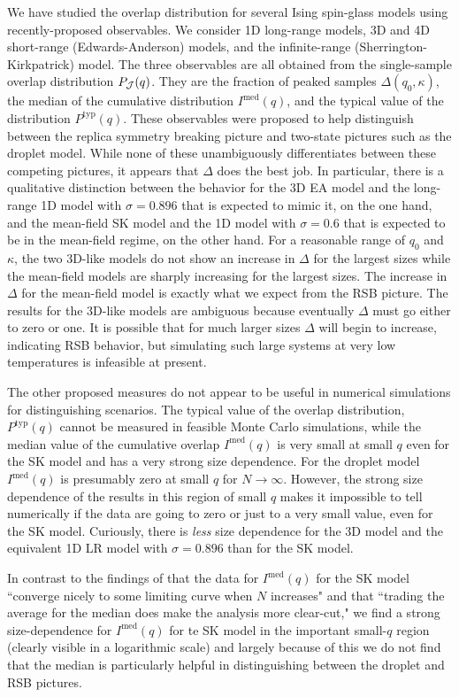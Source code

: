 We have studied the overlap distribution for several Ising spin-glass models
using recently-proposed observables. We consider 1D long-range models, 3D and
4D short-range (Edwards-Anderson) models, and the infinite-range
(Sherrington-Kirkpatrick) model. The three observables are all obtained from
the single-sample overlap distribution $P_{\mathcal{J}}(q)$. They are the fraction of
peaked samples $\Delta(q_0,\kappa)$, the median of the cumulative distribution
$I^{\mathrm{med}}(q)$, and the typical value of the distribution
$P^{\mathrm{typ}}(q)$. These observables were proposed to help distinguish
between the replica symmetry breaking picture and two-state pictures such as
the droplet model. While none of these unambiguously differentiates between
these competing pictures, it appears that $\Delta$ does the best job. In
particular, there is a qualitative distinction between the behavior for the 3D
EA model and the long-range 1D model with $\sigma=0.896$ that is expected to
mimic it, on the one hand, and the mean-field SK model and the 1D model with
$\sigma=0.6$ that is expected to be in the mean-field regime, on the other
hand. For a reasonable range of $q_0$ and $\kappa$, the two 3D-like models do
not show an increase in $\Delta$ for the largest sizes while the mean-field
models are sharply increasing for the largest sizes. The increase in $\Delta$
for the mean-field model is exactly what we expect from the RSB picture. The
results for the 3D-like models are ambiguous because eventually $\Delta$ must
go either to zero or one. It is possible that for much larger sizes $\Delta$
will begin to increase, indicating RSB behavior, but simulating such large
systems at very low temperatures is infeasible at present.

The other proposed measures do not appear to be useful in numerical simulations
for distinguishing scenarios. The typical value of the overlap distribution,
$P^{\mathrm{typ}}(q)$ cannot be measured in feasible Monte Carlo simulations,
while the median value of the cumulative overlap $I^{\mathrm{med}}(q)$ is very
small at small $q$ even for the SK model and has a very strong size dependence.
For the droplet model $I^{\mathrm{med}}(q)$ is presumably zero at small $q$ for
$N \to \infty$. However, the strong size dependence of the results in this
region of small $q$ makes it impossible to tell numerically if the data are
going to zero or just to a very small value, even for the SK model. Curiously,
there is \emph{less} size dependence for the 3D model and the equivalent 1D LR
model with $\sigma=0.896$ than for the SK model.

In contrast to the findings of \textcite{billoire2014cumulative} that the data
for $I^{\mathrm{med}}(q)$ for the SK model ``converge nicely to some limiting
curve when $N$ increases" and that ``trading the average for the median does
make the analysis more clear-cut," we find a strong size-dependence for
$I^{\mathrm{med}}(q)$ for te SK model in the important small-$q$ region
(clearly visible in a logarithmic scale) and largely because of this we do not
find that the median is particularly helpful in distinguishing between the
droplet and RSB pictures.
